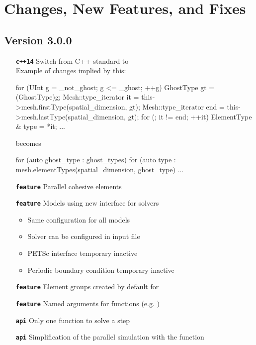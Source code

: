 \chapter*{Changes, New Features, and Fixes}

\section*{Version 3.0.0}

\begin{itemize}
\item[\textbf{\texttt{c++14}}] Switch from C++ standard  to \\
  Example of changes implied by this:
  \begin{cpp}
 for (UInt g = _not_ghost; g <= _ghost; ++g) {
   GhostType gt = (GhostType)g;
   Mesh::type_iterator it = this->mesh.firstType(spatial_dimension, gt);
   Mesh::type_iterator end = this->mesh.lastType(spatial_dimension, gt);
   for (; it != end; ++it) {
     ElementType & type = *it;
       ...
   }
 }
\end{cpp}
becomes
  \begin{cpp}
 for (auto ghost_type : ghost_types) {
   for (auto type : mesh.elementTypes(spatial_dimension,
                                      ghost_type) {
     ...
   }
 }
\end{cpp}
\item[\textbf{\texttt{feature}}] Parallel cohesive elements
\item[\textbf{\texttt{feature}}] Models using new interface for solvers
  \begin{itemize}
  \item Same configuration for all models
  \item Solver can be configured in input file
  \item PETSc interface temporary inactive
  \item Periodic boundary condition temporary inactive
  \end{itemize}
\item[\textbf{\texttt{feature}}] Element groups created by default for 
\item[\textbf{\texttt{feature}}] Named arguments for functions (e.g. )

\item[\textbf{\texttt{api}}] Only one function to solve a step 
\item[\textbf{\texttt{api}}] Simplification of the parallel simulation with the
   function

\end{itemize}
